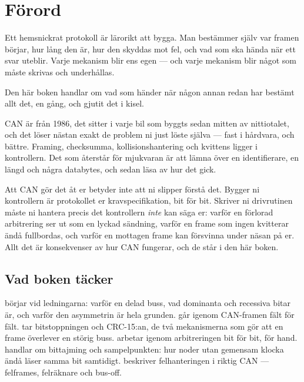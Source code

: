 \chapter*{Förord}

Ett hemsnickrat protokoll är lärorikt att bygga. Man bestämmer själv var framen börjar, hur lång
den är, hur den skyddas mot fel, och vad som ska hända när ett svar uteblir. Varje mekanism blir
ens egen --- och varje mekanism blir något som måste skrivas och underhållas.

Den här boken handlar om vad som händer när någon annan redan har bestämt allt det, en gång, och
gjutit det i kisel.

CAN är från 1986, det sitter i varje bil som byggts sedan mitten av nittiotalet, och det löser
nästan exakt de problem ni just löste själva --- fast i hårdvara, och bättre. Framing, checksumma,
kollisionshantering och kvittens ligger i kontrollern. Det som återstår för mjukvaran är att lämna
över en identifierare, en längd och några databytes, och sedan läsa av hur det gick.

\begin{aside}
\note Att CAN gör det åt er betyder inte att ni slipper förstå det. Bygger ni kontrollern är
protokollet er kravspecifikation, bit för bit. Skriver ni drivrutinen måste ni hantera precis det
kontrollern \emph{inte} kan säga er: varför en förlorad arbitrering ser ut som en lyckad
sändning, varför en frame som ingen kvitterar ändå fullbordas, och varför en mottagen frame kan
försvinna under näsan på er. Allt det är konsekvenser av hur CAN fungerar, och de står i den här
boken.
\end{aside}

\section*{Vad boken täcker}

 börjar vid ledningarna: varför en delad buss, vad dominanta och recessiva bitar
är, och varför den asymmetrin är hela grunden.  går igenom CAN-framen fält för fält.
 tar bitstoppningen och CRC-15:an, de två mekanismerna som gör att en frame
överlever en störig buss.  arbetar igenom arbitreringen bit för bit, för
hand.  handlar om bittajming och sampelpunkten: hur noder utan gemensam klocka
ändå läser samma bit samtidigt.  beskriver felhanteringen i riktig CAN --- felframes,
felräknare och bus-off.

